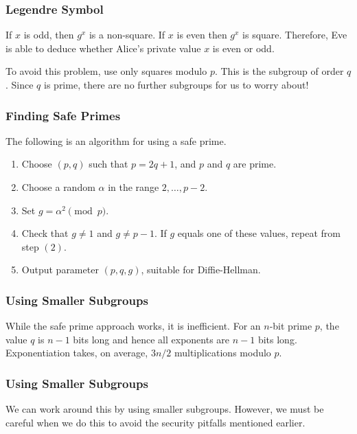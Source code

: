\documentclass{beamer}
\newcommand{\<}{\langle}
\renewcommand{\>}{\rangle}
\begin{document}
\begin{frame}
\frametitle{Legendre Symbol}

If $x$ is odd, then $g^x$ is a non-square. If $x$ is even then $g^x$ is square. Therefore, Eve is able to deduce whether Alice's private value $x$ is even or odd. \newline

To avoid this problem, use only squares modulo $p$. This is the subgroup of order $q$. Since $q$ is prime, there are no further subgroups for us to worry about!
\end{frame}


\begin{frame}
\frametitle{Finding Safe Primes}

The following is an algorithm for using a safe prime.\newline

\begin{enumerate}[(1)]
\item Choose $(p,q)$ such that $p=2q+1$, and $p$ and $q$ are prime.
\item Choose a random $\alpha$ in the range $2,\dots, p-2$. 
\item Set $g=\alpha^2 \pmod p$. 
\item Check that $g\ne 1$ and $g \ne p-1$. If $g$ equals one of these values, repeat from step $(2)$.
\item Output parameter $(p, q, g)$, suitable for Diffie-Hellman.
\end{enumerate}
\end{frame}


\begin{frame}
\frametitle{Using Smaller Subgroups}

While the safe prime approach works, it is inefficient. For an $n$-bit prime $p$, the value $q$ is $n-1$ bits long and hence all exponents are $n-1$ bits long. Exponentiation takes, on average, $3n/2$ multiplications modulo $p$. 
\end{frame}


\begin{frame}
\frametitle{Using Smaller Subgroups}

We can work around this by using smaller subgroups. However, we must be careful when we do this to avoid the security pitfalls mentioned earlier.
\end{frame}
\end{document}
